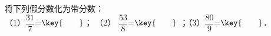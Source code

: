 将下列假分数化为带分数：\\（1）$\dfrac{31}{7}$=$\key{\qquad}$；
（2） $\dfrac{53}{8}$=$\key{\qquad}$ ；（3）$\dfrac{80}{9}$=$\key{\qquad}$．
